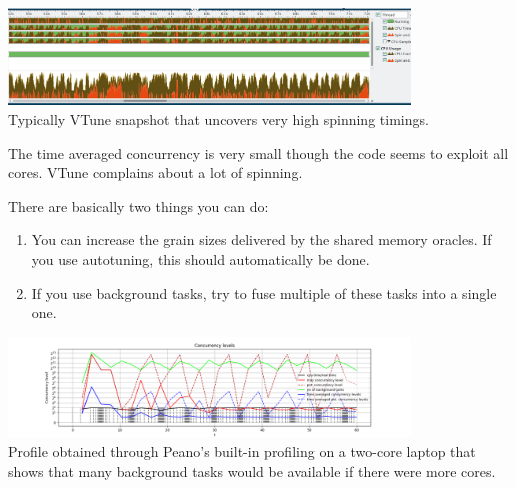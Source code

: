 \begin{center}
 \includegraphics[width=0.8\textwidth]{67_shared-memory-tuning/vtune.png}
 \\
 {\footnotesize
  Typically VTune snapshot that uncovers very high spinning timings.  
 }
\end{center}

\begin{smell}
  The time averaged concurrency is very small though the code seems to exploit
  all cores. VTune complains about a lot of spinning.
\end{smell}

\noindent
There are basically two things you can do: 

\begin{enumerate}
  \item You can increase the grain sizes delivered by the shared memory oracles.
  If you use autotuning, this should automatically be done.
  \item If you use background tasks, try to fuse multiple of these tasks into
  a single one.
\end{enumerate}


\begin{center}
 \includegraphics[width=0.8\textwidth]{67_shared-memory-tuning/concurrency.png}
 \\
 {\footnotesize
  Profile obtained through Peano's built-in profiling on a two-core laptop that
  shows that many background tasks would be available if there were more cores.
 }
\end{center}
